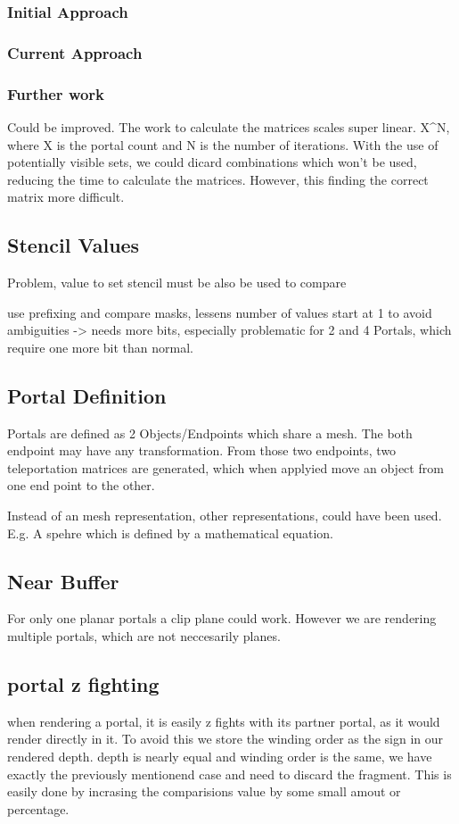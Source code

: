 \subsubsection{Initial Approach}
\subsubsection{Current Approach}

\subsubsection{Further work}
Could be improved. The work to calculate the matrices scales super linear. X^{N}, where X is the portal count and N is the number of iterations. With the use of potentially visible sets, we could dicard combinations which won't be used, reducing the time to calculate the matrices. However, this finding the correct matrix more difficult.


\subsection{Stencil Values}
Problem, value to set stencil must be also be used to compare

use prefixing and compare masks, lessens number of values
start at 1 to avoid ambiguities -> needs more bits, especially problematic for 2 and 4 Portals, which require one more bit than normal.




\subsection{Portal Definition}
Portals are defined as 2 Objects/Endpoints which share a mesh. The both endpoint may have any transformation. From those two endpoints, two teleportation matrices are generated, which when applyied move an object from one end point to the other.

Instead of an mesh representation, other representations, could have been used. E.g. A spehre which is defined by a mathematical equation.

\subsection{Near Buffer}
For only one planar portals a clip plane could work. However we are rendering multiple portals, which are not neccesarily planes.


\subsection{portal z fighting}
when rendering a portal, it is easily z fights with its partner portal, as it would render directly in it. To avoid this we store the winding order as the sign in our rendered depth.  depth is nearly equal and winding order is the same, we have exactly the previously mentionend case and need to discard the fragment. This is easily done by incrasing the comparisions value by some small amout or percentage.

